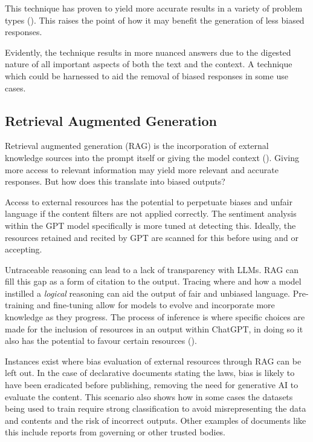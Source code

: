 \documentclass[12pt]{article}
\begin{document}
This technique has proven to yield more accurate results in a variety of problem types (\cite{trautmann-2023}). This raises the point of how it may benefit the generation of less biased responses.

Evidently, the technique results in more nuanced answers due to the digested nature of all important aspects of both the text and the context. A technique which could be harnessed to aid the removal of biased responses in some use cases.

\subsection{Retrieval Augmented Generation}

Retrieval augmented generation (RAG) is the incorporation of external knowledge sources into the prompt itself or giving the model context (\cite{gao-2023}). Giving more access to relevant information may yield more relevant and accurate responses. But how does this translate into biased outputs? 

Access to external resources has the potential to perpetuate biases and unfair language if the content filters are not applied correctly. The sentiment analysis within the GPT model specifically is more tuned at detecting this. Ideally, the resources retained and recited by GPT are scanned for this before using and or accepting.

Untraceable reasoning can lead to a lack of transparency with LLMs. RAG can fill this gap as a form of citation to the output. Tracing where and how a model instilled a \textit{logical} reasoning can aid the output of fair and unbiased language. Pre-training and fine-tuning allow for models to evolve and incorporate more knowledge as they progress. The process of inference is where specific choices are made for the inclusion of resources in an output within ChatGPT, in doing so it also has the potential to favour certain resources (\cite{gao-2023}).

Instances exist where bias evaluation of external resources through RAG can be left out. In the case of declarative documents stating the laws, bias is likely to have been eradicated before publishing, removing the need for generative AI to evaluate the content. This scenario also shows how in some cases the datasets being used to train require strong classification to avoid misrepresenting the data and contents and the risk of incorrect outputs. Other examples of documents like this include reports from governing or other trusted bodies.
\end{document}
